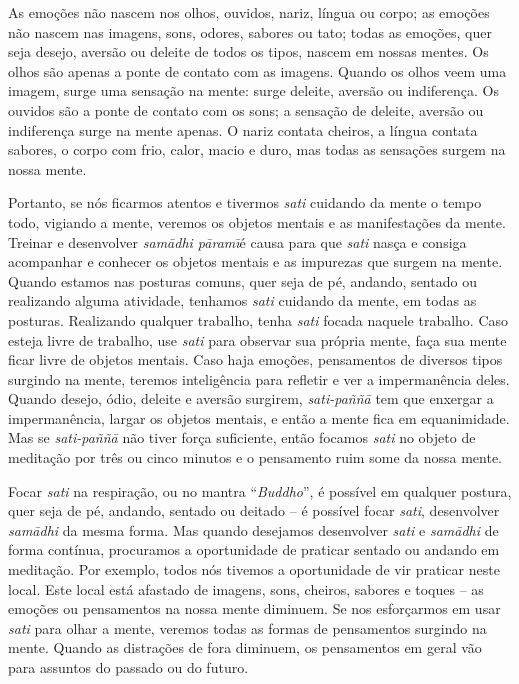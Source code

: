 As emoções não nascem nos olhos, ouvidos, nariz, língua ou corpo; as
emoções não nascem nas imagens, sons, odores, sabores ou tato; todas as
emoções, quer seja desejo, aversão ou deleite de todos os tipos, nascem
em nossas mentes. Os olhos são apenas a ponte de contato com as
imagens. Quando os olhos veem uma imagem, surge uma sensação na mente:
surge deleite, aversão ou indiferença. Os ouvidos são a ponte de
contato com os sons; a sensação de deleite, aversão ou indiferença
surge na mente apenas. O nariz contata cheiros, a língua contata
sabores, o corpo com frio, calor, macio e duro, mas todas as sensações
surgem na nossa mente.

Portanto, se nós ficarmos atentos e tivermos \textit{sati }cuidando
da mente o tempo todo, vigiando a mente, veremos os objetos mentais e
as manifestações da mente. Treinar e desenvolver \textit{sam\=adhi
p\=aram\=\i }é causa para que \textit{sati }nasça e consiga acompanhar
e conhecer os objetos mentais e as impurezas que surgem na mente.
Quando estamos nas posturas comuns, quer seja de pé, andando, sentado
ou realizando alguma atividade, tenhamos \textit{sati }cuidando da
mente, em todas as posturas. Realizando qualquer trabalho, tenha
\textit{sati }focada naquele trabalho. Caso esteja livre de trabalho,
use \textit{sati }para observar sua própria mente, faça sua mente ficar
livre de objetos mentais. Caso haja emoções, pensamentos de diversos
tipos surgindo na mente, teremos inteligência para refletir e ver a
impermanência deles. Quando desejo, ódio, deleite e aversão surgirem,
\textit{sati-paññ\=a }tem que enxergar a impermanência, largar os
objetos mentais, e então a mente fica em equanimidade. Mas se
\textit{sati-paññ\=a }não tiver força suficiente, então focamos
\textit{sati }no objeto de meditação por três ou cinco minutos e o
pensamento ruim some da nossa mente.

Focar \textit{sati }na respiração, ou no mantra “\textit{Buddho}”, é
possível em qualquer postura, quer seja de pé, andando, sentado ou
deitado – é possível focar \textit{sati}, desenvolver
\textit{sam\=adhi} da mesma forma. Mas quando desejamos desenvolver
\textit{sati} e \textit{sam\=adhi} de forma contínua, procuramos a
oportunidade de praticar sentado ou andando em meditação. Por exemplo,
todos nós tivemos a oportunidade de vir praticar neste local. Este
local está afastado de imagens, sons, cheiros, sabores e toques – as
emoções ou pensamentos na nossa mente diminuem. Se nos esforçarmos em
usar \textit{sati }para olhar a mente, veremos todas as formas de
pensamentos surgindo na mente. Quando as distrações de fora diminuem,
os pensamentos em geral vão para assuntos do passado ou do futuro.

